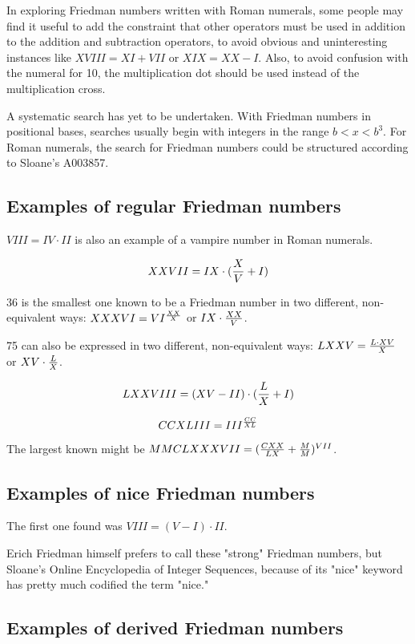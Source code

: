 \documentclass[12pt]{article}
\begin{document}
In exploring Friedman numbers written with Roman numerals, some people may find it useful to add the constraint that other operators must be used in addition to the addition and subtraction operators, to avoid obvious and uninteresting instances like $XVIII = XI + VII$ or $XIX = XX - I$. Also, to avoid confusion with the numeral for 10, the multiplication dot should be used instead of the multiplication cross.

A systematic search has yet to be undertaken. With Friedman numbers in positional bases, searches usually begin with integers in the range $b < x < b^3$. For Roman numerals, the search for Friedman numbers could be structured according to Sloane's A003857.

\subsection{Examples of regular Friedman numbers}

$VIII = IV \cdot II$ is also an example of a vampire number in Roman numerals.

$$XXVII = IX \cdot ({X \over V} + I)$$

36 is the smallest one known to be a Friedman number in two different, non-equivalent ways: $XXXVI = VI^{{{XX} \over X}}$ or $IX \cdot {{XX} \over V}$.

75 can also be expressed in two different, non-equivalent ways: $LXXV = {{L \cdot XV} \over X}$ or $XV \cdot {L \over X}$.

$$LXXVIII = (XV - II) \cdot ({L \over X} + I)$$

$$CCXLIII = III^{{CC} \over {XL}}$$

The largest known might be $MMCLXXXVII = ({{CXX} \over {LX}} + {M \over M})^{VII}$.

\subsection{Examples of nice Friedman numbers}

The first one found was $VIII = (V - I) \cdot II$.

Erich Friedman himself prefers to call these "strong" Friedman numbers, but Sloane's Online Encyclopedia of Integer Sequences, because of its "nice" keyword has pretty much codified the term "nice."

\subsection{Examples of derived Friedman numbers}
\end{document}
